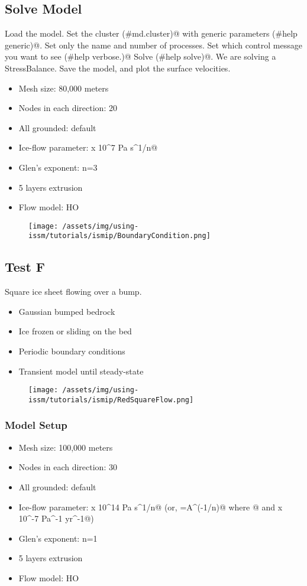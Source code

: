 \subsection{Solve Model} %
Load the \verb@BoundaryConditions@ model. Set the cluster \verb@(#md.cluster)@ with generic parameters \verb@(#help generic)@. Set only the name and number of processes. Set which control message you want to see \verb@(#help verbose.)@ Solve \verb@(#help solve)@. We are solving a StressBalance. Save the model, and plot the surface velocities.
\begin{itemize}
	\item Mesh size: 80,000 meters
	\item Nodes in each direction: 20
	\item All grounded: default
	\item Ice-flow parameter:  x 10^7 Pa s^1/n@
	\item Glen's exponent: n=3
	\item 5 layers extrusion
	\item Flow model: HO
\end{itemize}
\begin{figure}[H]
	\begin{center}
		\texttt{[image: /assets/img/using-issm/tutorials/ismip/BoundaryCondition.png]}
	\end{center}
\end{figure}
\subsection{Test F} %
Square ice sheet flowing over a bump.
\begin{itemize}
	\item Gaussian bumped bedrock
	\item Ice frozen or sliding on the bed
	\item Periodic boundary conditions
	\item Transient model until steady-state
\end{itemize}
\begin{figure}[H]
	\begin{center}
		\texttt{[image: /assets/img/using-issm/tutorials/ismip/RedSquareFlow.png]}
	\end{center}
\end{figure}
\subsubsection{Model Setup}
\begin{itemize}
	\item Mesh size: 100,000 meters
	\item Nodes in each direction: 30
	\item All grounded: default
	\item Ice-flow parameter:  x 10^14 Pa s^1/n@ (or, \verb@B=A^(-1/n)@ where @ and  x 10^-7 Pa^-1 yr^-1@)
	\item Glen's exponent: n=1
	\item 5 layers extrusion
	\item Flow model: HO
\end{itemize}
